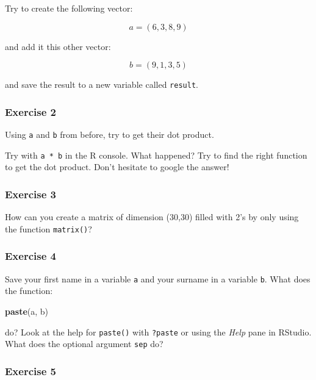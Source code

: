 \documentclass[
]{article}
\newenvironment{Shaded}{\begin{snugshade}}{\end{snugshade}}
\newcommand{\KeywordTok}[1]{\textcolor[rgb]{0.13,0.29,0.53}{\textbf{#1}}}
\newcommand{\NormalTok}[1]{#1}
\begin{document}
Try to create the following vector:

\[a = (6,3,8,9)\]

and add it this other vector:

\[b = (9,1,3,5)\]

and save the result to a new variable called \texttt{result}.

\hypertarget{exercise-2}{%
\subsubsection*{Exercise 2}\label{exercise-2}}

Using \texttt{a} and \texttt{b} from before, try to get their dot product.

Try with \texttt{a\ *\ b} in the R console. What happened?
Try to find the right function to get the dot product. Don't hesitate to google the answer!

\hypertarget{exercise-3}{%
\subsubsection*{Exercise 3}\label{exercise-3}}

How can you create a matrix of dimension (30,30) filled with 2's by only using the function \texttt{matrix()}?

\hypertarget{exercise-4}{%
\subsubsection*{Exercise 4}\label{exercise-4}}

Save your first name in a variable \texttt{a} and your surname in a variable \texttt{b}. What does the function:

\begin{Shaded}
\begin{Highlighting}[]
\KeywordTok{paste}\NormalTok{(a, b)}
\end{Highlighting}
\end{Shaded}

do? Look at the help for \texttt{paste()} with \texttt{?paste} or using the \emph{Help} pane in RStudio. What does the
optional argument \texttt{sep} do?

\hypertarget{exercise-5}{%
\subsubsection*{Exercise 5}\label{exercise-5}}
\end{document}
